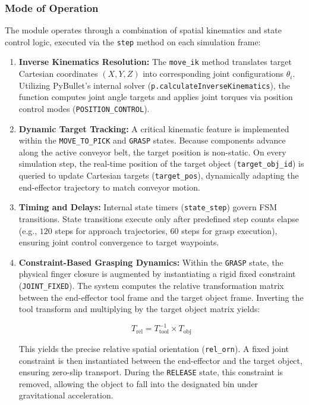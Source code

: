 \documentclass{article}
\begin{document}
\subsubsection{Mode of Operation}
The module operates through a combination of spatial kinematics and state control logic, executed via the \texttt{step} method on each simulation frame:

\begin{enumerate}
	\item \textbf{Inverse Kinematics Resolution:} The \texttt{move\_ik} method translates target Cartesian coordinates $(X, Y, Z)$ into corresponding joint configurations $\theta_i$. Utilizing PyBullet's internal solver (\texttt{p.calculateInverseKinematics}), the function computes joint angle targets and applies joint torques via position control modes (\texttt{POSITION\_CONTROL}).
	
	\item \textbf{Dynamic Target Tracking:} A critical kinematic feature is implemented within the \texttt{MOVE\_TO\_PICK} and \texttt{GRASP} states. Because components advance along the active conveyor belt, the target position is non-static. On every simulation step, the real-time position of the target object (\texttt{target\_obj\_id}) is queried to update Cartesian targets (\texttt{target\_pos}), dynamically adapting the end-effector trajectory to match conveyor motion.
	
	\item \textbf{Timing and Delays:} Internal state timers (\texttt{state\_step}) govern FSM transitions. State transitions execute only after predefined step counts elapse (e.g., $120$ steps for approach trajectories, $60$ steps for grasp execution), ensuring joint control convergence to target waypoints.
	
	\item \textbf{Constraint-Based Grasping Dynamics:} Within the \texttt{GRASP} state, the physical finger closure is augmented by instantiating a rigid fixed constraint (\texttt{JOINT\_FIXED}). The system computes the relative transformation matrix between the end-effector tool frame and the target object frame. Inverting the tool transform and multiplying by the target object matrix yields:
	
	$$T_{\text{rel}} = T_{\text{tool}}^{-1} \times T_{\text{obj}}$$
	
	This yields the precise relative spatial orientation (\texttt{rel\_orn}). A fixed joint constraint is then instantiated between the end-effector and the target object, ensuring zero-slip transport. During the \texttt{RELEASE} state, this constraint is removed, allowing the object to fall into the designated bin under gravitational acceleration.
\end{enumerate}
\end{document}

